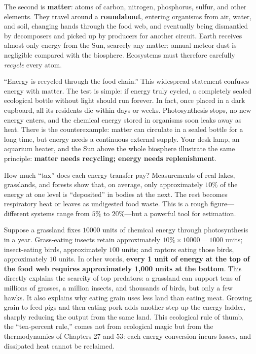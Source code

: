 The second is \textbf{matter}: atoms of carbon, nitrogen, phosphorus, sulfur, and other elements. They travel around a \textbf{roundabout}, entering organisms from air, water, and soil, changing hands through the food web, and eventually being dismantled by decomposers and picked up by producers for another circuit. Earth receives almost only energy from the Sun, scarcely any matter; annual meteor dust is negligible compared with the biosphere. Ecosystems must therefore carefully \emph{recycle} every atom.

\begin{wuqu}
``Energy is recycled through the food chain.'' This widespread statement confuses energy with matter. The test is simple: if energy truly cycled, a completely sealed ecological bottle without light should run forever. In fact, once placed in a dark cupboard, all its residents die within days or weeks. Photosynthesis stops, no new energy enters, and the chemical energy stored in organisms soon leaks away as heat. There is the counterexample: matter can circulate in a sealed bottle for a long time, but energy needs a continuous external supply. Your desk lamp, an aquarium heater, and the Sun above the whole biosphere illustrate the same principle: \textbf{matter needs recycling; energy needs replenishment}.
\end{wuqu}

\begin{qiaoliang}
How much ``tax'' does each energy transfer pay? Measurements of real lakes, grasslands, and forests show that, on average, only approximately $10\%$ of the energy at one level is ``deposited'' in bodies at the next. The rest becomes respiratory heat or leaves as undigested food waste. This is a rough figure---different systems range from $5\%$ to $20\%$---but a powerful tool for estimation.

Suppose a grassland fixes $10000$ units of chemical energy through photosynthesis in a year. Grass-eating insects retain approximately $10\%\times 10000=1000$ units; insect-eating birds, approximately $100$ units; and raptors eating those birds, approximately $10$ units. In other words, \textbf{every 1 unit of energy at the top of the food web requires approximately 1,000 units at the bottom}. This directly explains the scarcity of top predators: a grassland can support tens of millions of grasses, a million insects, and thousands of birds, but only a few hawks. It also explains why eating grain uses less land than eating meat. Growing grain to feed pigs and then eating pork adds another step up the energy ladder, sharply reducing the output from the same land. This ecological rule of thumb, the ``ten-percent rule,'' comes not from ecological magic but from the thermodynamics of Chapters 27 and 53: each energy conversion incurs losses, and dissipated heat cannot be reclaimed.
\end{qiaoliang}

